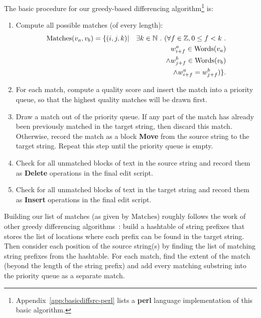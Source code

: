 The basic procedure for our greedy-based differencing
algorithm\footnote{Appendix~\ref{app:basicdiffsrc-perl} lists a
\textbf{perl} language implementation of this basic algorithm.}
is:
\begin{enumerate}
\item Compute all possible matches (of every length):
\begin{eqnarray*}
\mathrm{Matches}(v_{a}, v_{b}) = \{ (i,j,k) & |
            & \exists k \in \mathbb{N} \ .\  (
    \forall f \in \mathbb{Z}, 0 \le f < k \ . \\
    & & w^a_{i+f} \in \mathrm{Words}(v_{a}) \\
    & & \wedge w^b_{j+f} \in \mathrm{Words}(v_{b}) \\
    & & \wedge w^a_{i+f} = w^b_{j+f} ) \}.
\end{eqnarray*}

\item For each match, compute a quality score and insert the match into
    a priority queue, so that the highest quality matches will
    be drawn first.
\item Draw a match out of the priority queue.
    If any part of the match has already been previously matched
    in the target string, then discard this match.
    Otherwise, record the match as a block \textbf{Move}
    from the source string to the target string.
    Repeat this step until the priority queue is empty.
\item Check for all unmatched blocks of text in the source
    string and record them as \textbf{Delete} operations
    in the final edit script.
\item Check for all unmatched blocks of text in the target
    string and record them as \textbf{Insert} operations
    in the final edit script.
\end{enumerate}

Building our list of matches (as given by $\mathrm{Matches}$)
roughly follows the work of other greedy differencing
algorithms~\cite{Reichenberger1991,Burns1997}:
build a hashtable of string prefixes that stores the list
of locations where each prefix can be found in the target string.
Then consider each position of the source string(s) by finding
the list of matching string prefixes from the hashtable.
For each match, find the extent of the match
(beyond the length of the string prefix)
and add every matching substring into the priority queue
as a separate match.

